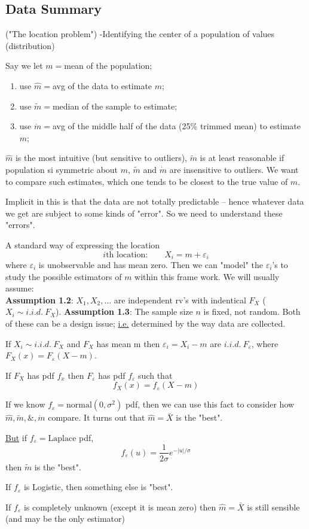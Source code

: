\documentclass[english, 11pt]{article}
\begin{document}
\subsection{Data Summary}
\begin{exmp} ("The location problem")
-Identifying the center of a population of values (distribution)

Say we let $m=$mean of the population;
\begin{enumerate}[1)]
\item use $\hat{m}=$avg of the data to estimate $m$;
\item use $\tilde{m}=$median of the sample to  estimate;
\item use $\dot{m}=$avg of the middle half of the data (25\% trimmed mean) to estimate $m$;
\end{enumerate}
$\hat{m}$ is the most intuitive (but sensitive to outliers), $\tilde{m}$ is at least reasonable if population si symmetric about $m$, $\tilde{m}$ and $\dot{m}$ are insensitive to outliers. We want to compare such estimates, which one tends to be closest to the true value of $m$.

Implicit in this is that the data are not totally predictable -- hence whatever data we get are subject to some kinds of "error". So we need to understand these "errors".

A standard way of expressing the location 
$$
i\text{th location:}\qquad X_i=m+\varepsilon_i
$$
where $\varepsilon_i$ is unobservable and has mean zero. Then we can "model" the $\varepsilon_i$'s to study the possible estimators of $m$ within this frame work. We will usually assume:\\
\textbf{Assumption 1.2}: $X_1, X_2, \dots$ are independent rv's with indentical $F_X$ ($X_i\sim i.i.d. ~F_X$).
\textbf{Assumption 1.3}: The sample size $n$ is fixed, not random.
Both of these can be a design issue; \underline{i.e.} determined by the way data are collected.

If $X_i\sim i.i.d. ~F_X$ and $F_X$ has mean m then $\varepsilon_i=X_i-m$ are $i.i.d. ~F_\varepsilon$, where $F_X(x)=F_\varepsilon(X-m)$.

If $F_X$ has pdf $f_x$ then $F_\varepsilon$ has pdf $f_\varepsilon$ such that 
$$
f_X(x)=f_\varepsilon(X-m)
$$

If we know $f_\varepsilon=\text{normal}(0, \sigma^2)$ pdf, then we can use this fact to consider how $\hat{m}, \tilde{m}, \&, \dot{m}$ compare. It turns out that $\hat{m}=\bar{X}$ is the "best".

\underline{But} if $f_\varepsilon=\text{Laplace}$ pdf,
$$
f_\varepsilon(u)=\frac{1}{2\sigma}e^{-|u|/\sigma}
$$
then $\tilde{m}$ is the "best".

If $f_\varepsilon$ is Logistic, then something else is "best". 

If $f_\varepsilon$ is completely unknown (except it is mean zero) then $\hat{m}=\bar{X}$ is still sensible (and may be the only estimator)
\end{exmp}
\end{document}
